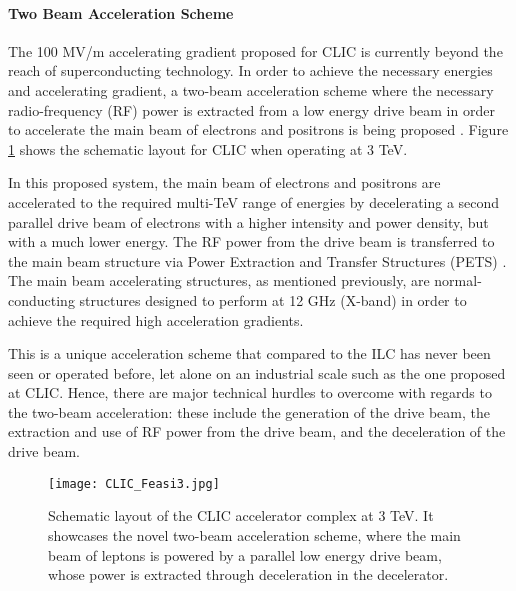 \paragraph{Two Beam Acceleration Scheme}

The 100 MV/m accelerating gradient proposed for CLIC is currently beyond the reach of superconducting technology. In order to achieve the necessary energies and accelerating gradient, a two-beam acceleration scheme where the necessary radio-frequency (RF) power is extracted from a low energy drive beam in order to accelerate the main beam of electrons and positrons is being proposed \cite{AccSciTech:Wilson}. Figure \ref{fig:CLIC:Feasi3} shows the schematic layout for CLIC when operating at 3 TeV.

In this proposed system, the main beam of electrons and positrons are accelerated to the required multi-TeV range of energies by decelerating a second parallel drive beam of electrons with a higher intensity and power density, but with a much lower energy. The RF power from the drive beam is transferred to the main beam structure via Power Extraction and Transfer Structures (PETS) \cite{CLIC:Concept}. The main beam accelerating structures, as mentioned previously, are normal-conducting structures designed to perform at 12 GHz (X-band) in order to achieve the required high acceleration gradients.

This is a unique acceleration scheme that compared to the ILC has never been seen or operated before, let alone on an industrial scale such as the one proposed at CLIC. Hence, there are major technical hurdles to overcome with regards to the two-beam acceleration: these include the generation of the drive beam, the extraction and use of RF power from the drive beam, and the deceleration of the drive beam. \cite{CLIC:Concept}

\begin{figure}[!htb]
    \centering
    \texttt{[image: CLIC\_Feasi3.jpg]}
    
    \caption{Schematic layout of the CLIC accelerator complex at 3 TeV. It showcases the novel two-beam acceleration scheme, where the main beam of leptons is powered by a parallel low energy drive beam, whose power is extracted through deceleration in the decelerator. \cite{CLIC:Concept}}
    \label{fig:CLIC:Feasi3}
\end{figure}

